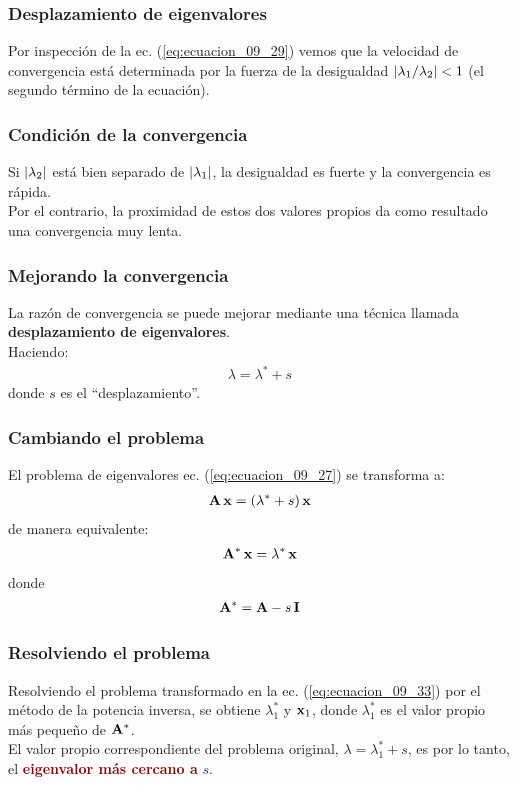 \documentclass[12pt]{beamer}
\begin{document}
\begin{frame}
\frametitle{Desplazamiento de eigenvalores}
Por inspección de la ec. (\ref{eq:ecuacion_09_29}) vemos que la velocidad de convergencia está determinada por la fuerza de la desigualdad $\abs{\lambda_{1}/\lambda_{2}} < 1$ (el segundo término de la ecuación).
\end{frame}
\begin{frame}
\frametitle{Condición de la convergencia}
Si $\abs{\lambda_{2}}$ está bien separado de $\abs{\lambda_{1}}$, la desigualdad es fuerte y la convergencia es rápida.
\\
\bigskip
\pause
Por el contrario, la proximidad de estos dos valores propios da como resultado una convergencia muy lenta.
\end{frame}
\begin{frame}
\frametitle{Mejorando la convergencia}
La razón de convergencia se puede mejorar mediante una técnica llamada \textbf{\textcolor{cinnamon}{desplazamiento de eigenvalores}}.
\\
\bigskip
\pause
Haciendo:
\pause
\begin{align}
\lambda = \lambda^{*} + s
\label{eq:ecuacion_09_32}
\end{align}
donde $s$ es el \enquote{desplazamiento}.
\end{frame}
\begin{frame}
\frametitle{Cambiando el problema}
El problema de eigenvalores ec. (\ref{eq:ecuacion_09_27}) se transforma a:
\pause
\begin{align*}
\vb{ A \, x} = (\lambda^{*} + s) \, \vb{x}
\end{align*}
\pause
de manera equivalente:
\begin{align}
\vb{A^{*} \, x} = \lambda^{*} \, \vb{x}
\label{eq:ecuacion_09_33}
\end{align}
donde
\begin{align}
\vb{A}^{*} = \vb{A} - s \, \vb{I}
\label{eq:ecuacion_09_34}
\end{align}
\end{frame}
\begin{frame}
\frametitle{Resolviendo el problema}
Resolviendo el problema transformado en la ec. (\ref{eq:ecuacion_09_33}) por el método de la potencia inversa, se obtiene $\lambda^{*}_{1}$ y $\vb{x}_{1}$, \pause donde $\lambda^{*}_{1}$ es el valor propio más pequeño de $\vb{A}^{*}$.
\\
\bigskip
\pause
El valor propio correspondiente del problema original, $\lambda = \lambda_{1}^{*} + s$, es por lo tanto, el \textbf{\textcolor{darkred}{eigenvalor más cercano a}} $s$.
\end{frame}
\end{document}
